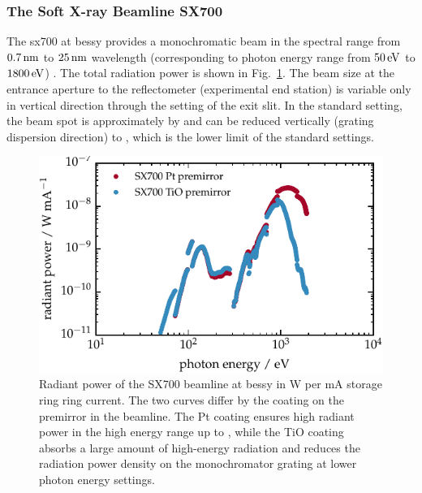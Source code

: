 \subsubsection{The Soft X-ray Beamline SX700}
The \gls{sx700} at \gls{bessy} provides a monochromatic beam in the spectral range from $\nm{0.7}$ to $\nm{25}$ wavelength (corresponding to photon energy range from $\ev{50}$ to $\ev{1800}$) \cite{beckhoff_quarter-century_2009}. The total radiation power is shown in Fig.~\ref{ch_exp:fig_flux_sx700}. The beam size at the entrance aperture to the reflectometer (experimental end station) is variable only in vertical direction through the setting of the exit slit. In the standard setting, the beam spot is approximately  by  \cite{scholze_high-accuracy_2001} and can be reduced vertically (grating dispersion direction) to , which is the lower limit of the standard settings.
\begin{figure}[htb]
    \includegraphics{img/beamline_radiant_power.pdf}
    \caption[Radiant power of the SX700 beamline.]{Radiant power of the SX700 beamline at \gls{bessy} in W per mA storage ring ring current. The two curves differ by the coating on the premirror in the beamline. The Pt coating ensures high radiant power in the high energy range up to , while the TiO coating absorbs a large amount of high-energy radiation and reduces the radiation power density on the monochromator grating at lower photon energy settings.}
    \label{ch_exp:fig_flux_sx700}
\end{figure}

